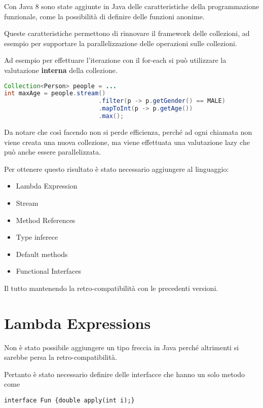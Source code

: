 Con Java 8 sono state aggiunte in Java delle caratteristiche della programmazione funzionale, come la possibilità di definire delle funzioni anonime. 

Queste caratteristiche permettono di rinnovare il framework delle collezioni, ad esempio per supportare la parallelizzazione delle operazioni sulle collezioni.

Ad esempio per effettuare l'iterazione con il for-each si può utilizzare la valutazione \textbf{interna} della collezione.

\begin{lstlisting}[language=Java]
Collection<Person> people = ...
int maxAge = people.stream()
                          .filter(p -> p.getGender() == MALE)
                          .mapToInt(p -> p.getAge())
                          .max();
\end{lstlisting}

Da notare che così facendo non si perde efficienza, perché ad ogni chiamata non viene creata una nuova collezione, ma viene effettuata una valutazione lazy che può anche essere parallelizzata.

Per ottenere questo risultato è stato necessario aggiungere al linguaggio:

\begin{itemize}
	\item Lambda Expression
	\item Stream
	\item Method References
	\item Type inferece
	\item Default methods
	\item Functional Interfaces
\end{itemize}

Il tutto mantenendo la retro-compatibilità con le precedenti versioni.

\section{Lambda Expressions}

Non è stato possibile aggiungere un tipo freccia in Java perché altrimenti si sarebbe persa la retro-compatibilità.

Pertanto è stato necessario definire delle interfacce che hanno un solo metodo come

\begin{lstlisting}
interface Fun {double apply(int i);}
\end{lstlisting}


